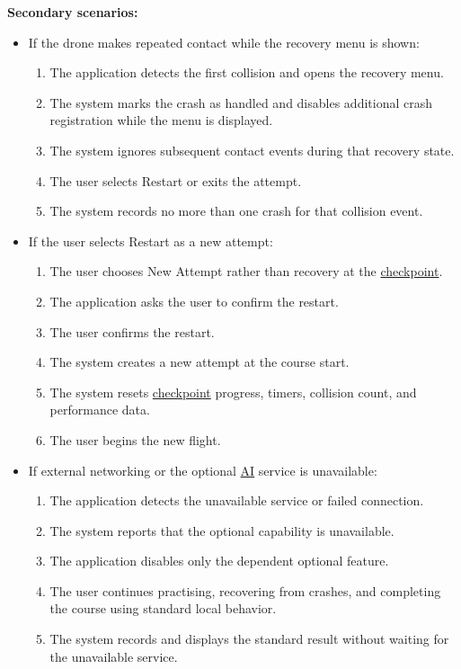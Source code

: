 \documentclass[12pt]{article}
\begin{document}
\begin{description}
\textbf{Secondary scenarios:}
\begin{itemize}
\item If the drone makes repeated contact while the recovery menu is shown:
\begin{enumerate}
\item The application detects the first collision and opens the recovery menu.
\item The system marks the crash as handled and disables additional crash
registration while the menu is displayed.
\item The system ignores subsequent contact events during that recovery state.
\item The user selects Restart or exits the attempt.
\item The system records no more than one crash for that collision event.
\end{enumerate}
\item If the user selects Restart as a new attempt:
\begin{enumerate}
\item The user chooses New Attempt rather than recovery at the \hyperlink{glos:Checkpoint}{checkpoint}.
\item The application asks the user to confirm the restart.
\item The user confirms the restart.
\item The system creates a new attempt at the course start.
\item The system resets \hyperlink{glos:Checkpoint}{checkpoint} progress, timers, collision count, and
performance data.
\item The user begins the new flight.
\end{enumerate}
\item If external networking or the optional \hyperlink{glos:AI}{AI} service is unavailable:
\begin{enumerate}
\item The application detects the unavailable service or failed connection.
\item The system reports that the optional capability is unavailable.
\item The application disables only the dependent optional feature.
\item The user continues practising, recovering from crashes, and completing
the course using standard local behavior.
\item The system records and displays the standard result without waiting for the
unavailable service.

\end{enumerate}
\end{itemize}
\end{description}
\end{document}
